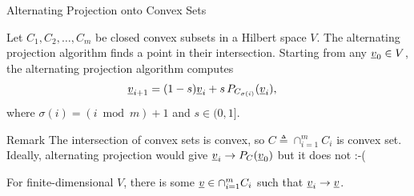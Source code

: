 \documentclass[10pt,letterpaper,english]{beamer}
\begin{document}
\begin{frame}{Alternating Projection onto Convex Sets}

Let $C_{1},C_{2},\ldots,C_{m}$ be closed convex subsets in a Hilbert space $V$.
The alternating projection algorithm finds a point in their intersection. Starting from any $\underline v_{0}\in V$, the alternating projection algorithm computes 
\begin{align*}
\underline v_{i+1} & = (1-s) \underline{v}_i + s\, P_{C_{\sigma(i)}}(\underline v_{i}),
\end{align*}
where $\sigma(i)=(i\bmod m)+1$ and $s\in(0,1]$.

\vspace{4mm}

\begin{block}{Remark}
The intersection of convex sets is convex, so $C \triangleq \cap_{i=1}^{m}C_{i}$ is convex set.
Ideally, alternating projection would give $\underline{v}_i \to P_C (\underline{v}_0)$ but it does not :-(
\end{block}

\begin{theorem}[Bregman]
For finite-dimensional $V$, there is some $\underline v\in\cap_{i=1}^{m}C_{i}$ such that $\underline{v}_i \to \underline{v}$.
\end{theorem}

\end{frame}
\end{document}
